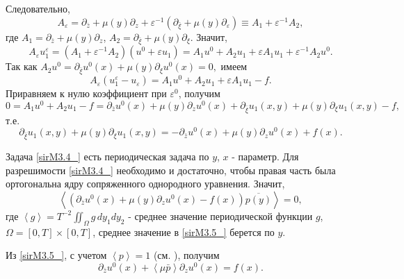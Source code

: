 Следовательно,
\begin{equation*}
A_{\varepsilon } =\partial _{\bar{z}} +\mu (y)\partial _{z} +\varepsilon ^{-1} (\partial _{\bar{\xi }} +\mu (y)\partial _{\varepsilon } )\equiv A_{1} +\varepsilon ^{-1} A_{2} ,
\end{equation*}
где $A_{1} =\partial _{\bar{z}} +\mu (y)\partial _{z} $, $A_{2} =\partial _{\bar{\xi }} +\mu (y)\partial _{\xi } $.
Значит,
\begin{equation*}
A_{\varepsilon } u_{1}^{\varepsilon } =(A_{1} +\varepsilon ^{-1} A_{2} )(u^{0} +\varepsilon u_{1} )=A_{1} u^{0} +A_{2} u_{1} +\varepsilon A_{1} u_{1} +\varepsilon ^{-1} A_{2} u^{0}.
\end{equation*}
Так как $A_{2} u^{0} =\partial _{\bar{\xi }} u^{0} (x)+\mu (y)\partial _{\xi } u^{0} (x)=0,$ имеем
\begin{equation}
\label{sirM3.3_} A_{\varepsilon } (u_{1}^{\varepsilon } -u_{\varepsilon } )=A_{1} u^{0} +A_{2} u_{1} +\varepsilon A_{1} u_{1} -f. \end{equation}
Приравняем к нулю коэффициент при $\varepsilon ^{0} $, получим
\begin{equation*}
0=A_{1} u^{0} +A_{2} u_{1} -f=\partial _{\bar{z}} u^{0} (x)+\mu (y)\partial _{z} u^{0} (x)+\partial _{\bar{\xi }} u_{1} (x,y)+\mu (y)\partial _{\xi } u_{1} (x,y)-f,
\end{equation*}
т.е.
\begin{equation}
\partial _{\bar{\xi }} u_{1} (x,y)+\mu (y)\partial _{\xi } u_{1} (x,y)=-\partial _{\bar{z}} u^{0} (x)+\mu (y)\partial _{z} u^{0} (x)+f(x). \label{sirM3.4_}
\end{equation}

Задача \eqref{sirM3.4_} есть периодическая задача по $y$,  $x$ - параметр.
Для разрешимости \eqref{sirM3.4_} необходимо и достаточно, чтобы правая часть была ортогональна ядру сопряженного однородного уравнения. Значит,
\begin{equation}
\left\langle \left(\partial _{\bar{z}} u^{0} (x)+\mu (y)\partial _{z} u^{0} (x)-f(x)\right)\overline{p(y)}\right\rangle =0, \label{sirM3.5_}
\end{equation}
где  $\left\langle g\right\rangle =T^{-2} \iint \nolimits _{\Omega }g\, dy_{1}  dy_{2} $ - среднее значение периодической функции $g$, $\Omega =\left[0,T\right]\times \left[0,T\right]$, среднее значение в \eqref{sirM3.5_} берется по $y$.

Из \eqref{sirM3.5_}, с учетом $\left\langle p\right\rangle =1$ (см. \cite{Sirazh3}), получим
\begin{equation}
\partial _{\bar{z}} u^{0} (x)+\left\langle \mu \bar{p}\right\rangle \partial _{z} u^{0} (x)=f(x). \label{sirM3.6_}
\end{equation}


